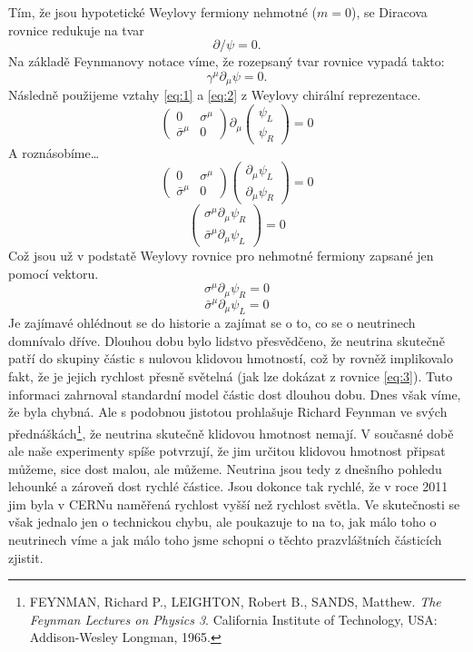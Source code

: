 \documentclass{../../../../style/mkimain}
\begin{document}
\begin{enumerate}
Tím, že jsou hypotetické Weylovy fermiony nehmotné ($m=0$), se Diracova rovnice redukuje na tvar
 \begin{equation}\label{eq:3}
 \partial\!\!\!/\psi=0\text{.}    
 \end{equation}
 Na základě Feynmanovy  notace víme, že rozepsaný tvar rovnice vypadá takto:
$$\gamma^\mu\partial_\mu\psi=0\text{.}$$
Následně použijeme vztahy \ref{eq:1} a \ref{eq:2} z Weylovy chirální reprezentace.
$$ \begin{pmatrix}
        0 & \sigma^\mu\\
        \bar{\sigma}^\mu & 0
    \end{pmatrix} \partial_\mu \begin{pmatrix}
        \psi_L\\
        \psi_R
    \end{pmatrix}=0 $$
A roznásobíme\dots
$$ \begin{pmatrix}
        0 & \sigma^\mu\\
        \bar{\sigma}^\mu & 0
    \end{pmatrix} \begin{pmatrix}
        \partial_\mu\psi_L\\
        \partial_\mu\psi_R
    \end{pmatrix}=0 $$
$$ \begin{pmatrix}
        \sigma^\mu \partial_\mu\psi_R\\
        \bar{\sigma}^\mu \partial_\mu\psi_L
    \end{pmatrix}=0 $$
    Což jsou už v podstatě Weylovy rovnice pro nehmotné fermiony zapsané jen pomocí vektoru.
    $$
    \sigma^\mu \partial_\mu \psi_R = 0
    $$
    $$
    \bar{\sigma}^\mu \partial_\mu \psi_L = 0
    $$
    Je zajímavé ohlédnout se do historie a zajímat se o to, co se o neutrinech domnívalo dříve. Dlouhou dobu bylo lidstvo přesvědčeno, že neutrina skutečně patří do skupiny částic s nulovou klidovou hmotností, což by rovněž implikovalo fakt, že je jejich rychlost přesně světelná (jak lze dokázat z rovnice \ref{eq:3}). Tuto informaci zahrnoval standardní model částic dost dlouhou dobu. Dnes však víme, že byla chybná. Ale s podobnou jistotou prohlašuje Richard Feynman ve svých přednáškách\footnote{FEYNMAN, Richard P., LEIGHTON, Robert B., SANDS, Matthew. \textit{The Feynman Lectures on Physics 3}. California Institute of Technology, USA: Addison-Wesley Longman, 1965.}, že neutrina skutečně klidovou hmotnost nemají. V současné době ale naše experimenty spíše potvrzují, že jim určitou klidovou hmotnost připsat můžeme, sice dost malou, ale můžeme. Neutrina jsou tedy z dnešního pohledu lehounké a zároveň dost rychlé částice. Jsou dokonce tak rychlé, že v roce 2011 jim byla v CERNu naměřená rychlost vyšší než rychlost světla. Ve skutečnosti se však jednalo jen o technickou chybu, ale poukazuje to na to, jak málo toho o neutrinech víme a jak málo toho jsme schopni o těchto prazvláštních částicích zjistit.


\end{enumerate}
\end{document}
